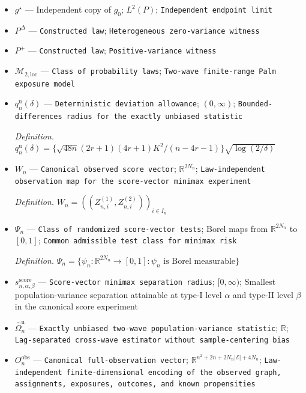 \documentclass{article}
\begin{document}
\begin{itemize}
  \item \(g^\star\) --- Independent copy of \(g_0\); \(L^2(P)\); \texttt{Independent endpoint limit}
  \item \(P^{\Delta}\) --- \texttt{Constructed law}; \texttt{Heterogeneous zero-\allowbreak{}variance witness}
  \item \(P^{+}\) --- \texttt{Constructed law}; \texttt{Positive-\allowbreak{}variance witness}
  \item \(\mathcal M_{2,\mathrm{loc}}\) --- \texttt{Class of probability laws}; \texttt{Two-\allowbreak{}wave finite-\allowbreak{}range Palm exposure model}
  \item \(q_n^{\mathrm u}(\delta)\) --- \texttt{Deterministic deviation allowance}; \((0,\infty)\); \texttt{Bounded-\allowbreak{}differences radius for the exactly unbiased statistic}
  \par\smallskip\noindent\emph{Definition.} \(q_n^{\mathrm u}(\delta)=\{\sqrt{48n}(2r+1)(4r+1)K^2/(n-4r-1)\}\sqrt{\log(2/\delta)}\)
  \item \(W_n\) --- \texttt{Canonical observed score vector}; \(\mathbb R^{2N_n}\); \texttt{Law-\allowbreak{}independent observation map for the score-\allowbreak{}vector minimax experiment}
  \par\smallskip\noindent\emph{Definition.} \(W_n=((Z_{n,i}^{(1)},Z_{n,i}^{(2)}))_{i\in I_n}\)
  \item \(\Psi_n\) --- \texttt{Class of randomized score-\allowbreak{}vector tests}; Borel maps from \(\mathbb R^{2N_n}\) to \([0,1]\); \texttt{Common admissible test class for minimax risk}
  \par\smallskip\noindent\emph{Definition.} \(\Psi_n=\{\psi_n:\mathbb R^{2N_n}\to[0,1]:\psi_n\text{ is Borel measurable}\}\)
  \item \(s_{n,\alpha,\beta}^{\mathrm{score}}\) --- \texttt{Score-\allowbreak{}vector minimax separation radius}; \([0,\infty)\); Smallest population-variance separation attainable at type-I level \(\alpha\) and type-II level \(\beta\) in the canonical score experiment
  \item \(\widehat\Omega_n^{\mathrm u}\) --- \texttt{Exactly unbiased two-\allowbreak{}wave population-\allowbreak{}variance statistic}; \(\mathbb R\); \texttt{Lag-\allowbreak{}separated cross-\allowbreak{}wave estimator without sample-\allowbreak{}centering bias}
  \item \(O_n^{\mathrm{obs}}\) --- \texttt{Canonical full-\allowbreak{}observation vector}; \(\mathbb R^{n^2+2n+2N_n|\mathcal E|+4N_n}\); \texttt{Law-\allowbreak{}independent finite-\allowbreak{}dimensional encoding of the observed graph,\allowbreak{} assignments,\allowbreak{} exposures,\allowbreak{} outcomes,\allowbreak{} and known propensities}

\end{itemize}
\end{document}
